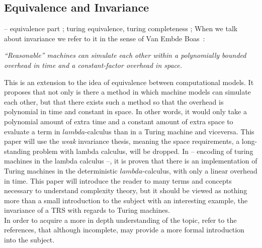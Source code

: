 \documentclass[12pt]{article}
\begin{document}
\subsection{Equivalence and Invariance}
-- equivalence part ; turing equivalence, turing completeness ;
When we talk about invariance we refer to it in the sense of Van Embde Boas~\cite{machine-models}: \\
\begin{center}
 \textit{\enquote{Reasonable} machines can simulate each other within a polynomially
bounded overhead in time and a constant-factor overhead in space.}
\end{center}
This is an extension to the idea of equivalence between computational models. It proposes that not only is there a method in which machine models can simulate each other, but that there exists such a method so that the overhead is polynomial in time and constant in space. In other words, it would only take a polynomial amount of extra time and a constant amount of extra space to evaluate a term in $lambda$-calculus than in a Turing machine and viceversa.
This paper will use the \textit{weak} invariance thesis, meaning the space requirements, a long-standing problem with lambda calculus, will be dropped.
In -- encoding of turing machines in the lambda calculus --, it is proven that there is an implementation of Turing machines in the deterministic $lambda$-calculus, with only a linear overhead in time. This paper will introduce the reader to many terms and concepts necessary to understand complexity theory, but it should be viewed as nothing more than a small introduction to the subject with an interesting example, the invariance of a TRS with regards to Turing machines. \\
In order to acquire a more in depth understanding of the topic, refer to the references, that although incomplete, may provide a more formal introduction into the subject.
\end{document}
